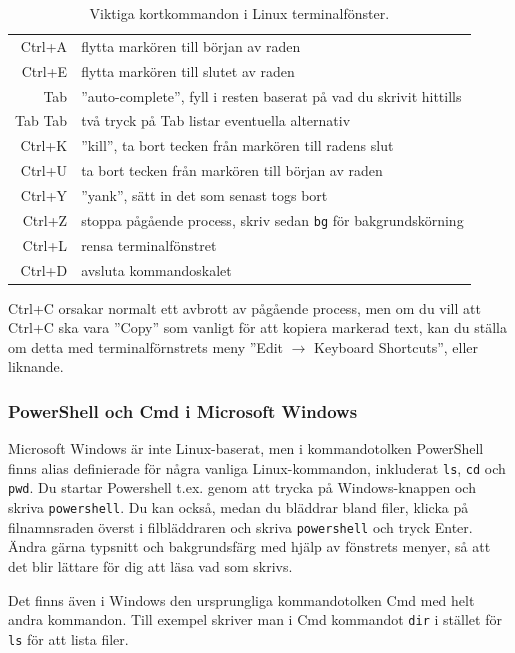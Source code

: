 \begin{table}[H]
\renewcommand{\arraystretch}{1.15}
\begin{tabular}{@{}r | l}
Ctrl+A & flytta markören till början av raden \\
Ctrl+E & flytta markören till slutet av raden \\
Tab & ''auto-complete'', fyll i resten baserat på vad du skrivit hittills \\
Tab Tab & två tryck på Tab listar eventuella alternativ \\
Ctrl+K & ''kill'', ta bort tecken från markören till radens slut\\
Ctrl+U & ta bort tecken från markören till början av raden \\
Ctrl+Y & ''yank'', sätt in det som senast togs bort\\
Ctrl+Z & stoppa pågående process, skriv sedan \texttt{bg} för bakgrundskörning\\
Ctrl+L & rensa terminalfönstret\\
Ctrl+D & avsluta kommandoskalet \\
\end{tabular}
    \caption{Viktiga kortkommandon i Linux terminalfönster.}
    \label{fig:terminal:shortcuts}
\end{table}

\noindent Ctrl+C orsakar normalt ett avbrott av pågående process, men om du vill att Ctrl+C ska vara ''Copy'' som vanligt för att kopiera markerad text, kan du ställa om detta med terminalförnstrets  meny ''Edit $\rightarrow$ Keyboard Shortcuts'', eller liknande.




 
\subsubsection{PowerShell och Cmd i Microsoft Windows}
Microsoft Windows är inte Linux-baserat, men i kommandotolken PowerShell finns alias definierade för några vanliga Linux-kommandon, inkluderat \texttt{ls}, \texttt{cd} och \texttt{pwd}. Du startar Powershell t.ex. genom att trycka på Windows-knappen och skriva \texttt{powershell}. Du kan också, medan du bläddrar bland filer, klicka på filnamnsraden överst i filbläddraren och skriva \texttt{powershell} och tryck Enter. Ändra gärna typsnitt och bakgrundsfärg med hjälp av fönstrets menyer, så att det blir lättare för dig att läsa vad som skrivs.

Det finns även i Windows den ursprungliga kommandotolken Cmd med helt andra kommandon. Till exempel skriver man i Cmd kommandot \texttt{dir} i stället för \texttt{ls} för att lista filer. 



